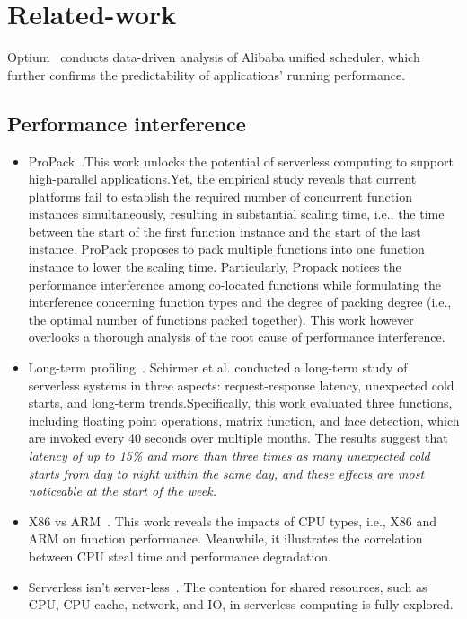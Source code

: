 \section{Related-work}
Optium~\cite{eurosys23-optium} conducts data-driven analysis of Alibaba unified scheduler, which further confirms the predictability of applications' running performance.

\subsection{Performance interference}
\begin{itemize}
    \item ProPack~\cite{hpdc23-propack}.This work unlocks the potential of serverless computing to support high-parallel applications.Yet, the empirical study reveals that current platforms fail to establish the required number of concurrent function instances simultaneously, resulting in substantial scaling time, i.e., the time between the start of the first function instance and the start of the last instance. ProPack proposes to pack multiple functions into one function instance to lower the scaling time. Particularly, Propack notices the performance interference among co-located functions while formulating the interference concerning function types and the degree of packing degree (i.e., the optimal number of functions packed together). This work however overlooks a thorough analysis of the root cause of performance interference.
    \item Long-term profiling~\cite{sesame23-night-shift}. Schirmer et al. conducted a long-term study of serverless systems in three aspects: request-response latency, unexpected cold starts, and long-term trends.Specifically, this work evaluated three functions, including floating point operations, matrix function, and face detection, which are invoked every 40 seconds over multiple months.
    The results suggest that \textit{latency of up to 15\% and more than three times as many unexpected cold starts from day to night within the same day, and these effects are most noticeable at the start of the week.}
    \item X86 vs ARM~\cite{icpe22-x86-vs-arm}. This work reveals the impacts of CPU types, i.e., X86 and ARM on function performance. Meanwhile, it illustrates the correlation between CPU steal time and performance degradation.
    \item Serverless isn't server-less~\cite{wosc20-serverless-not-server-less}.
    The contention for shared resources, such as CPU, CPU cache, network, and IO, in serverless computing is fully explored. 

\end{itemize}
